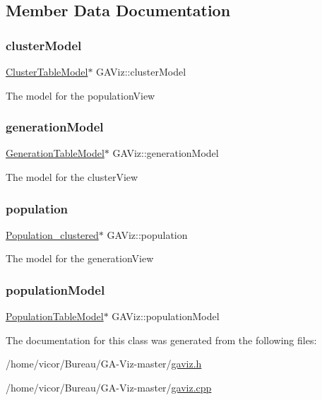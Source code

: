 \subsection{Member Data Documentation}
\mbox{\label{class_g_a_viz_a54ca452496eac96f82e2d9d7f02318a9}} 
\subsubsection{\texorpdfstring{cluster\+Model}{clusterModel}}
{\footnotesize\ttfamily \hyperlink{class_cluster_table_model}{Cluster\+Table\+Model}$\ast$ G\+A\+Viz\+::cluster\+Model}

The model for the population\+View \mbox{\label{class_g_a_viz_a7ecc629f7c9ab499cf483f836371f8f0}} 
\subsubsection{\texorpdfstring{generation\+Model}{generationModel}}
{\footnotesize\ttfamily \hyperlink{class_generation_table_model}{Generation\+Table\+Model}$\ast$ G\+A\+Viz\+::generation\+Model}

The model for the cluster\+View \mbox{\label{class_g_a_viz_a9b5057af4e3badc544bbab1efa0bdb39}} 
\subsubsection{\texorpdfstring{population}{population}}
{\footnotesize\ttfamily \hyperlink{class_population__clustered}{Population\+\_\+clustered}$\ast$ G\+A\+Viz\+::population}

The model for the generation\+View \mbox{\label{class_g_a_viz_adc930d20d092eeab1badfab22bbc8b6d}} 
\subsubsection{\texorpdfstring{population\+Model}{populationModel}}
{\footnotesize\ttfamily \hyperlink{class_population_table_model}{Population\+Table\+Model}$\ast$ G\+A\+Viz\+::population\+Model}



The documentation for this class was generated from the following files\+:\begin{DoxyCompactItemize}
\item 
/home/vicor/\+Bureau/\+G\+A-\/\+Viz-\/master/\hyperlink{gaviz_8h}{gaviz.\+h}\item 
/home/vicor/\+Bureau/\+G\+A-\/\+Viz-\/master/\hyperlink{gaviz_8cpp}{gaviz.\+cpp}\end{DoxyCompactItemize}
